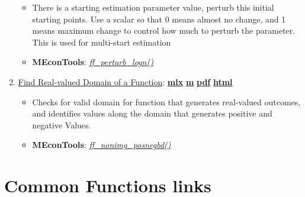 \documentclass[
]{book}
\providecommand{\tightlist}{%
  \setlength{\itemsep}{0pt}\setlength{\parskip}{0pt}}
\begin{document}
\begin{enumerate}
  \begin{itemize}
  \tightlist
  \item
    There is a starting estimation parameter value, perturb this initial starting points. Use a scalar so that 0 means almost no change, and 1 means maximum change to control how much to perturb the parameter. This is used for multi-start estimation
  \item
    \textbf{MEconTools}: \emph{\href{https://github.com/FanWangEcon/MEconTools/blob/master/MEconTools/generate/ff_perturb_logn.m}{ff\_perturb\_logn()}}
  \end{itemize}
\item
  \href{https://fanwangecon.github.io/MEconTools/MEconTools/doc/generate/htmlpdfm/fx_nonimg_posnegbd.html}{Find Real-valued Domain of a Function}: \href{https://github.com/FanWangEcon/MEconTools/blob/master/MEconTools/doc/generate/fx_nonimg_posnegbd.mlx}{\textbf{mlx}} \textbar{} \href{https://github.com/FanWangEcon/MEconTools/blob/master/MEconTools/doc/generate/htmlpdfm/fx_nonimg_posnegbd.m}{\textbf{m}} \textbar{} \href{https://github.com/FanWangEcon/MEconTools/blob/master/MEconTools/doc/generate/htmlpdfm/fx_nonimg_posnegbd.pdf}{\textbf{pdf}} \textbar{} \href{https://fanwangecon.github.io/MEconTools/MEconTools/doc/generate/htmlpdfm/fx_nonimg_posnegbd.html}{\textbf{html}}

  \begin{itemize}
  \tightlist
  \item
    Checks for valid domain for function that generates real-valued outcomes, and identifies values along the domain that generates positive and negative Values.
  \item
    \textbf{MEconTools}: \emph{\href{https://github.com/FanWangEcon/MEconTools/blob/master/MEconTools/generate/ff_nonimg_posnegbd.m}{ff\_nonimg\_posnegbd()}}
  \end{itemize}
\end{enumerate}

\hypertarget{common-functions-links}{%
\section{Common Functions links}\label{common-functions-links}}
\end{document}
